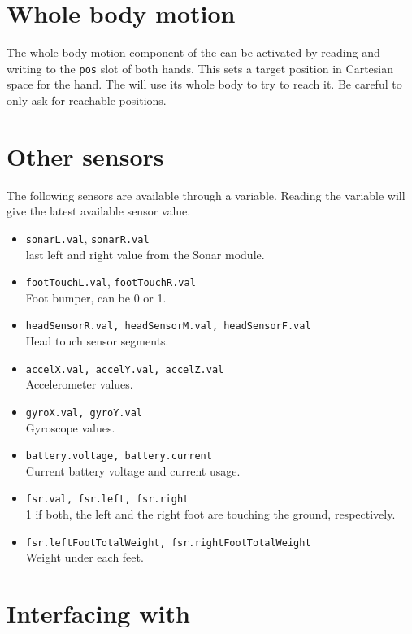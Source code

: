 \section{Whole body motion}

The whole body motion component of the \naoqi can be activated by reading
and writing to the \lstinline|pos| slot of both hands. This sets a target
position in Cartesian space for the hand. The \naoqi will use its whole body
to try to reach it. Be careful to only ask for reachable positions.

\section{Other sensors}

The following sensors are available through a \us variable.  Reading the
variable will give the latest available sensor value.

\begin{itemize}
\item \lstinline|sonarL.val|, \lstinline|sonarR.val| \\
    last left and right value from the Sonar module.
\item \lstinline|footTouchL.val|, \lstinline|footTouchR.val| \\
    Foot bumper, can be 0 or 1.
\item \lstinline|headSensorR.val, headSensorM.val, headSensorF.val| \\
    Head touch sensor segments.
\item \lstinline|accelX.val, accelY.val, accelZ.val| \\
    Accelerometer values.
\item \lstinline|gyroX.val, gyroY.val| \\
    Gyroscope values.
\item \lstinline|battery.voltage, battery.current| \\
    Current battery voltage and current usage.
  \item \lstinline|fsr.val, fsr.left, fsr.right| \\
    1 if both, the left and the right foot are touching the ground,
    respectively.
\item \lstinline|fsr.leftFootTotalWeight, fsr.rightFootTotalWeight| \\
    Weight under each feet.
\end{itemize}

\section{Interfacing with \naoqi}

